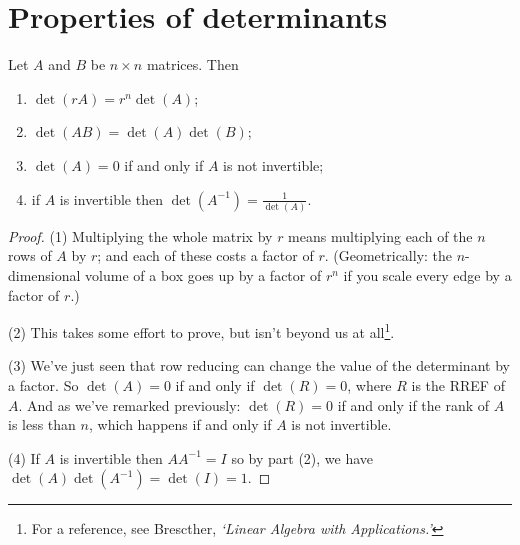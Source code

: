 
\section{Properties of determinants}

\begin{theorem}
Let $A$ and $B$ be $n\times n$ matrices.  Then
\begin{enumerate}[(1)]
\item $\det(rA) = r^n\det(A)$;
\item $\det(AB) = \det(A)\det(B)$;
\item $\det(A) = 0$ if and only if $A$ is not invertible;
\item if $A$ is invertible then $\det(A^{-1}) = \frac{1}{\det(A)}$.
\end{enumerate}
\end{theorem}

\begin{proof}
(1) Multiplying the whole matrix by $r$ means multiplying each of
the $n$ rows of $A$ by $r$; and each of these costs a factor of $r$.
(Geometrically:  the $n$-dimensional volume of a box goes up by a
factor of $r^n$ if you scale every edge by a factor of $r$.)

(2) This takes some effort to prove, but isn't beyond us at all\footnote{ For a reference, see Brescther, \emph{`Linear Algebra with  Applications.'}  }.

(3) We've just seen that row reducing can change the value of 
the determinant by a  factor.  So $\det(A) = 0$
if and only if $\det(R) = 0$, where $R$ is the RREF of $A$.
And as we've remarked previously: $\det(R)=0$ if and only if the rank of $A$ is less than $n$, which happens if and only if $A$ is not invertible. 

(4) If $A$ is invertible then $AA^{-1} = I$ so by part (2), we have
$\det(A) \det(A^{-1}) = \det(I) = 1$.
\end{proof} 







